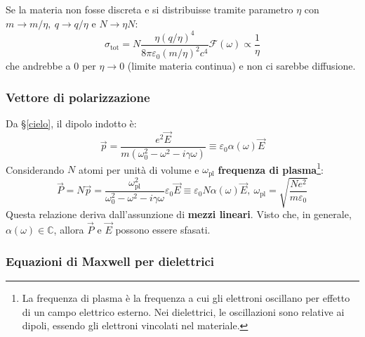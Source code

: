 \documentclass[a4paper]{scrartcl}
\numberwithin{equation}{subsection}
\theoremstyle{style1}
\begin{document}
Se la materia non fosse discreta e si distribuisse tramite parametro $\eta$ con $m\to m / \eta, \ q\to q / \eta$ e $N\to \eta N$:
\begin{equation}
	\sigma _\text{tot}= N \frac{\eta (q / \eta)^4}{8\pi\varepsilon _0 (m / \eta)^2 c^4}\mathcal{F}(\omega)\propto \frac{1}{\eta}
\end{equation}
che andrebbe a $0$ per $\eta \to 0$ (limite materia continua) e non ci sarebbe diffusione.
\subsubsection{Vettore di polarizzazione}

Da \S\ref{cielo}, il dipolo indotto \`e:
\begin{equation}
	\vec{p} = \frac{e^2 \vec{E}}{m(\omega_0^2 - \omega^2 - i \gamma\omega)}\equiv \varepsilon _0 \alpha (\omega) \vec{E}
\end{equation}
Considerando $N$ atomi per unit\`a di volume e $\omega_\text{pl}$ \textbf{frequenza di plasma}\footnote{La frequenza di plasma \`e la frequenza a cui gli elettroni oscillano per effetto di un campo elettrico esterno. Nei dielettrici, le oscillazioni sono relative ai dipoli, essendo gli elettroni vincolati nel materiale.}:
\begin{equation}
	\vec{P}= N\vec{p}= \frac{\omega_\text{pl}^2}{\omega_0^2 -\omega^2 - i\gamma\omega}\varepsilon _0 \vec{E}\equiv \varepsilon _0 N \alpha (\omega) \vec{E},\ \omega_\text{pl}=\sqrt{\frac{Ne^2 }{m \varepsilon _0}} 
\end{equation}
Questa relazione deriva dall'assunzione di \textbf{mezzi lineari}. Visto che, in generale, $\alpha (\omega) \in \mathbb{C}$, allora $\vec{P}$ e $\vec{E}$ possono essere sfasati.
\subsubsection{Equazioni di Maxwell per dielettrici}
\end{document}
